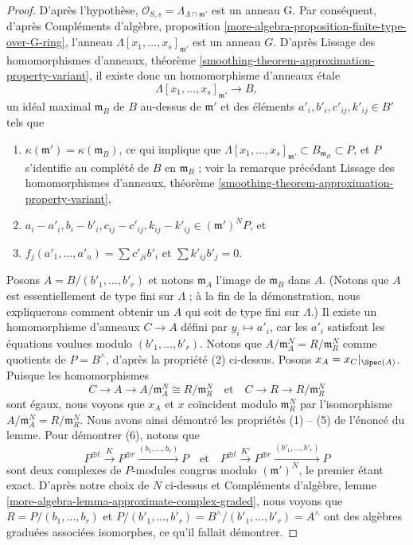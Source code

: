 \begin{proof}
\medskip\noindent
D'après l'hypothèse,
$\mathcal{O}_{S, s} = \Lambda_{\Lambda \cap \mathfrak m'}$ est un anneau G.
Par conséquent, d'après Compléments d'algèbre, proposition
\ref{more-algebra-proposition-finite-type-over-G-ring}, l'anneau
$\Lambda[x_1, \ldots, x_s]_{\mathfrak m'}$ est un anneau $G$. D'après
Lissage des homomorphismes d'anneaux, théorème
\ref{smoothing-theorem-approximation-property-variant}, il existe donc un
homomorphisme d'anneaux étale
$$
\Lambda[x_1, \ldots, x_s]_{\mathfrak m'} \to B,
$$
un idéal maximal $\mathfrak m_B$ de $B$ au-dessus de $\mathfrak m'$ et des
éléments $a'_i, b'_i, c'_{ij}, k'_{ij} \in B'$ tels que
\begin{enumerate}
\item $\kappa(\mathfrak m') = \kappa(\mathfrak m_B)$, ce qui implique que
$\Lambda[x_1, \ldots, x_s]_{\mathfrak m'} \subset B_{\mathfrak m_B}
\subset P$, et $P$ s'identifie au complété de $B$ en $\mathfrak m_B$ ; voir
la remarque précédant Lissage des homomorphismes d'anneaux, théorème
\ref{smoothing-theorem-approximation-property-variant},
\item $a_i - a'_i, b_i - b'_i, c_{ij} - c'_{ij}, k_{ij} - k'_{ij} \in
(\mathfrak m')^N P$, et
\item $f_j(a'_1, \ldots, a'_u) = \sum c'_{ji} b'_i$ et
$\sum k'_{ij}b'_j = 0$.
\end{enumerate}
Posons $A = B/(b'_1, \ldots, b'_r)$ et notons $\mathfrak m_A$ l'image de
$\mathfrak m_B$ dans $A$. (Notons que $A$ est essentiellement de type fini
sur $\Lambda$ ; à la fin de la démonstration, nous expliquerons comment
obtenir un $A$ qui soit de type fini sur $\Lambda$.) Il existe un
homomorphisme d'anneaux $C \to A$ défini par $y_i \mapsto a'_i$, car les $a'_i$
satisfont les équations voulues modulo $(b'_1, \ldots, b'_r)$. Notons que
$A/\mathfrak m_A^N = R/\mathfrak m_R^N$ comme quotients de $P = B^\wedge$,
d'après la propriété (2) ci-dessus. Posons $x_A = x_C|_{\Spec(A)}$. Puisque
les homomorphismes
$$
C \to A \to A/\mathfrak m_A^N \cong R/\mathfrak m_R^N
\quad\text{et}\quad
C \to R \to R/\mathfrak m_R^N
$$
sont égaux, nous voyons que $x_A$ et $x$ coïncident modulo
$\mathfrak m_R^N$ par l'isomorphisme
$A/\mathfrak m_A^N = R/\mathfrak m_R^N$. Nous avons ainsi démontré les
propriétés (1) -- (5) de l'énoncé du lemme. Pour démontrer (6), notons que
$$
P^{\oplus t} \xrightarrow{K}
P^{\oplus r} \xrightarrow{(b_1, \ldots, b_r)}
P
\quad\text{et}\quad
P^{\oplus t} \xrightarrow{K'}
P^{\oplus r} \xrightarrow{(b'_1, \ldots, b'_r)}
P
$$
sont deux complexes de $P$-modules congrus modulo $(\mathfrak m')^N$, le
premier étant exact. D'après notre choix de $N$ ci-dessus et Compléments
d'algèbre, lemme \ref{more-algebra-lemma-approximate-complex-graded}, nous
voyons que $R = P/(b_1, \ldots, b_r)$ et
$P/(b'_1, \ldots, b'_r) = B^\wedge/(b'_1, \ldots, b'_r) = A^\wedge$
ont des algèbres graduées associées isomorphes, ce qu'il fallait démontrer.


\end{proof}
